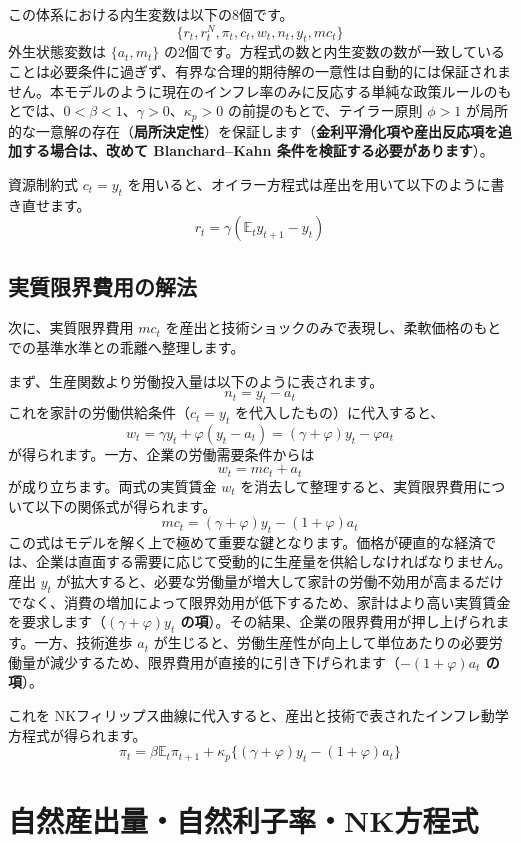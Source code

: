 \documentclass[
  japanese,
  lualatex,
  ja=standard,
  12pt,
  a4paper]{ltjsarticle}
\begin{document}
この体系における内生変数は以下の8個です。 \[
\{r_t,r_t^N,\pi_t,c_t,w_t,n_t,y_t,mc_t\}
\] 外生状態変数は \(\{a_t, m_t\}\)
の2個です。方程式の数と内生変数の数が一致していることは必要条件に過ぎず、有界な合理的期待解の一意性は自動的には保証されません。本モデルのように現在のインフレ率のみに反応する単純な政策ルールのもとでは、\(0<\beta<1\)、\(\gamma>0\)、\(\kappa_p>0\)
の前提のもとで、テイラー原則 \(\phi>1\)
が局所的な一意解の存在（\textbf{局所決定性}）を保証します（\textbf{金利平滑化項や産出反応項を追加する場合は、改めて
Blanchard--Kahn 条件を検証する必要があります}）。

資源制約式 \(c_t=y_t\)
を用いると、オイラー方程式は産出を用いて以下のように書き直せます。 \[
r_t=\gamma\left(\mathbb{E}_t y_{t+1}-y_t\right)
\]

\subsection{実質限界費用の解法}\label{ux5b9fux8ceaux9650ux754cux8cbbux7528ux306eux89e3ux6cd5}

次に、実質限界費用 \(mc_t\)
を産出と技術ショックのみで表現し、柔軟価格のもとでの基準水準との乖離へ整理します。

まず、生産関数より労働投入量は以下のように表されます。 \[
n_t=y_t-a_t
\] これを家計の労働供給条件（\(c_t=y_t\) を代入したもの）に代入すると、
\[
w_t=\gamma y_t+\varphi(y_t-a_t)
=(\gamma+\varphi)y_t-\varphi a_t
\] が得られます。一方、企業の労働需要条件からは \[
w_t=mc_t+a_t
\] が成り立ちます。両式の実質賃金 \(w_t\)
を消去して整理すると、実質限界費用について以下の関係式が得られます。 \[
mc_t=
(\gamma+\varphi)y_t-(1+\varphi)a_t
\]
この式はモデルを解く上で極めて重要な鍵となります。価格が硬直的な経済では、企業は直面する需要に応じて受動的に生産量を供給しなければなりません。産出
\(y_t\)
が拡大すると、必要な労働量が増大して家計の労働不効用が高まるだけでなく、消費の増加によって限界効用が低下するため、家計はより高い実質賃金を要求します（\textbf{\((\gamma+\varphi)y_t\)
の項}）。その結果、企業の限界費用が押し上げられます。一方、技術進歩
\(a_t\)
が生じると、労働生産性が向上して単位あたりの必要労働量が減少するため、限界費用が直接的に引き下げられます（\textbf{\(-(1+\varphi)a_t\)
の項}）。

これを
NKフィリップス曲線に代入すると、産出と技術で表されたインフレ動学方程式が得られます。
\[
\pi_t=
\beta\mathbb{E}_t\pi_{t+1}
+\kappa_p\{(\gamma+\varphi)y_t-(1+\varphi)a_t\}
\]

\section{自然産出量・自然利子率・NK方程式}\label{ux81eaux7136ux7523ux51faux91cfux81eaux7136ux5229ux5b50ux7387nkux65b9ux7a0bux5f0f}
\end{document}
